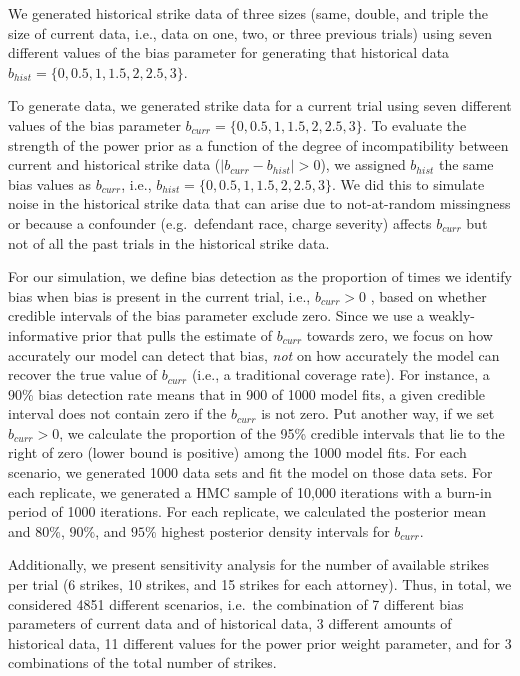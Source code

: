 \documentclass[12pt]{article}
\begin{document}
We generated historical strike data of three sizes (same, double, and triple the size of current data, i.e., data on one, two, or three previous trials) using seven different values of the bias parameter for generating that historical data \(b_{hist}=\{0,0.5,1,1.5,2, 2.5,3\}\).

To generate data, we generated strike data for a current trial using seven different values of the bias parameter \(b_{curr}=\{0,0.5,1,1.5,2, 2.5,3\}\). To evaluate the strength of the power prior as a function of the degree of incompatibility between current and historical strike data (\(\lvert b_{curr} - b_{hist} \rvert > 0\)), we assigned \(b_{hist}\) the same bias values as \(b_{curr}\), i.e., \(b_{hist}=\{0,0.5,1,1.5,2, 2.5,3\}\). We did this to simulate noise in the historical strike data that can arise due to not-at-random missingness or because a confounder (e.g.~defendant race, charge severity) affects \(b_{curr}\) but not of all the past trials in the historical strike data.

For our simulation, we define bias detection as the proportion of times we identify bias when bias is present in the current trial, i.e., \(b_{curr} > 0\) , based on whether credible intervals of the bias parameter exclude zero. Since we use a weakly-informative prior that pulls the estimate of \(b_{curr}\) towards zero, we focus on how accurately our model can detect that bias, \emph{not} on how accurately the model can recover the true value of \(b_{curr}\) (i.e., a traditional coverage rate). For instance, a 90\% bias detection rate means that in 900 of 1000 model fits, a given credible interval does not contain zero if the \(b_{curr}\) is not zero. Put another way, if we set \(b_{curr}>0\), we calculate the proportion of the 95\% credible intervals that lie to the right of zero (lower bound is positive) among the 1000 model fits. For each scenario, we generated 1000 data sets and fit the model on those data sets. For each replicate, we generated a HMC sample of 10,000 iterations with a burn-in period of 1000 iterations. For each replicate, we calculated the posterior mean and \(80\%\), \(90\%\), and \(95\%\) highest posterior density intervals for \(b_{curr}\).

Additionally, we present sensitivity analysis for the number of available strikes per trial (6 strikes, 10 strikes, and 15 strikes for each attorney). Thus, in total, we considered 4851 different scenarios, i.e.~the combination of 7 different bias parameters of current data and of historical data, 3 different amounts of historical data, 11 different values for the power prior weight parameter, and for 3 combinations of the total number of strikes.
\end{document}
